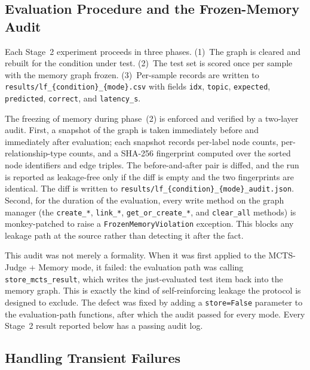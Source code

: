 \documentclass[12pt,a4paper]{report}
\begin{document}
\subsection{Evaluation Procedure and the Frozen-Memory Audit}

Each Stage~2 experiment proceeds in three phases. (1)~The graph is cleared and rebuilt for the condition under test. (2)~The test set is scored once per sample with the memory graph frozen. (3)~Per-sample records are written to \texttt{results/lf\_\{condition\}\_\{mode\}.csv} with fields \texttt{idx}, \texttt{topic}, \texttt{expected}, \texttt{predicted}, \texttt{correct}, and \texttt{latency\_s}.

The freezing of memory during phase~(2) is enforced and verified by a two-layer audit. First, a snapshot of the graph is taken immediately before and immediately after evaluation; each snapshot records per-label node counts, per-relationship-type counts, and a SHA-256 fingerprint computed over the sorted node identifiers and edge triples. The before-and-after pair is diffed, and the run is reported as leakage-free only if the diff is empty and the two fingerprints are identical. The diff is written to \texttt{results/lf\_\{condition\}\_\{mode\}\_audit.json}. Second, for the duration of the evaluation, every write method on the graph manager (the \texttt{create\_*}, \texttt{link\_*}, \texttt{get\_or\_create\_*}, and \texttt{clear\_all} methods) is monkey-patched to raise a \texttt{FrozenMemoryViolation} exception. This blocks any leakage path at the source rather than detecting it after the fact.

This audit was not merely a formality. When it was first applied to the MCTS-Judge + Memory mode, it failed: the evaluation path was calling \texttt{store\_mcts\_result}, which writes the just-evaluated test item back into the memory graph. This is exactly the kind of self-reinforcing leakage the protocol is designed to exclude. The defect was fixed by adding a \texttt{store=False} parameter to the evaluation-path functions, after which the audit passed for every mode. Every Stage~2 result reported below has a passing audit log.

\subsection{Handling Transient Failures}
\end{document}

